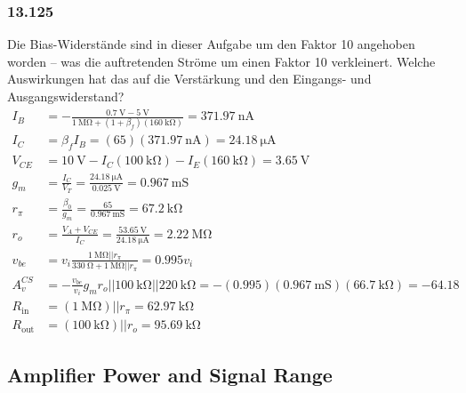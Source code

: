 \documentclass[11pt,a4paper,titlepage]{article}
\begin{document}
\subsubsection*{13.125}
Die Bias-Widerstände sind in dieser Aufgabe um den Faktor 10 angehoben worden – was die auftretenden Ströme um einen Faktor 10 verkleinert. Welche Auswirkungen hat das auf die Verstärkung und den Eingangs- und Ausgangswiderstand?
\begin{equation}
\begin{aligned}
  I_B  &= -\frac{\SI{0.7}{\volt} - \SI{5}{\volt}}{\SI{1}{\mega\ohm} + (1+\beta_f)(\SI{160}{\kilo\ohm})} = \SI{371.97}{\nano\ampere} \\
  I_C &= \beta_fI_B = (65)(\SI{371.97}{\nano\ampere}) = \SI{24.18}{\micro\ampere}\\
  V_{CE} &= \SI{10}{\volt} - I_C(\SI{100}{\kilo\ohm}) - I_E(\SI{160}{\kilo\ohm}) = \SI{3.65}{\volt} \\
  g_m &= \frac{I_C}{V_T} = \frac{\SI{24.18}{\micro\ampere}}{\SI{0.025}{\volt}} = \SI{0.967}{\milli\siemens} \\
  r_{\pi} &= \frac{\beta_0}{g_m} = \frac{65}{\SI{0.967}{\milli\siemens}} = \SI{67.2}{\kilo\ohm} \\
  r_o &= \frac{V_A + V_{CE}}{I_C} = \frac{\SI{53.65}{\volt}}{\SI{24.18}{\micro\ampere}} = \SI{2.22}{\mega\ohm} \\
  v_{be} &= v_i\frac{\SI{1}{\mega\ohm}||r_{\pi}}{\SI{330}{\ohm} + \SI{1}{\mega\ohm}||r_{\pi}} = 0.995v_i \\
  A_v^{CS} &= - \frac{v_{be}}{v_i}g_mr_o||\SI{100}{\kilo\ohm}||\SI{220}{\kilo\ohm} = -(0.995)(\SI{0.967}{\milli\siemens})(\SI{66.7}{\kilo\ohm}) = -64.18 \\
  R_{\text{in}} &= (\SI{1}{\mega\ohm})||r_{\pi} = \SI{62.97}{\kilo\ohm}\\
  R_{\text{out}} &= (\SI{100}{\kilo\ohm})||r_o = \SI{95.69}{\kilo\ohm}
\end{aligned}
\end{equation}

\subsection{Amplifier Power and Signal Range}
\end{document}
